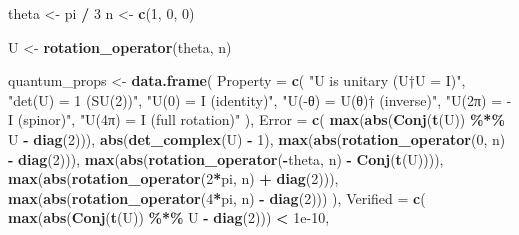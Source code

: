 \documentclass[
]{book}
\newenvironment{Shaded}{\begin{snugshade}}{\end{snugshade}}
\newcommand{\AttributeTok}[1]{\textcolor[rgb]{0.13,0.29,0.53}{#1}}
\newcommand{\DecValTok}[1]{\textcolor[rgb]{0.00,0.00,0.81}{#1}}
\newcommand{\FloatTok}[1]{\textcolor[rgb]{0.00,0.00,0.81}{#1}}
\newcommand{\FunctionTok}[1]{\textcolor[rgb]{0.13,0.29,0.53}{\textbf{#1}}}
\newcommand{\NormalTok}[1]{#1}
\newcommand{\OtherTok}[1]{\textcolor[rgb]{0.56,0.35,0.01}{#1}}
\newcommand{\SpecialCharTok}[1]{\textcolor[rgb]{0.81,0.36,0.00}{\textbf{#1}}}
\newcommand{\StringTok}[1]{\textcolor[rgb]{0.31,0.60,0.02}{#1}}
\theoremstyle{definition}
\theoremstyle{definition}
\theoremstyle{definition}
\theoremstyle{definition}
\theoremstyle{remark}
\begin{document}
\begin{Shaded}
\begin{Highlighting}[]
\NormalTok{theta }\OtherTok{\textless{}{-}}\NormalTok{ pi }\SpecialCharTok{/} \DecValTok{3}
\NormalTok{n }\OtherTok{\textless{}{-}} \FunctionTok{c}\NormalTok{(}\DecValTok{1}\NormalTok{, }\DecValTok{0}\NormalTok{, }\DecValTok{0}\NormalTok{)}

\NormalTok{U }\OtherTok{\textless{}{-}} \FunctionTok{rotation\_operator}\NormalTok{(theta, n)}

\NormalTok{quantum\_props }\OtherTok{\textless{}{-}} \FunctionTok{data.frame}\NormalTok{(}
  \AttributeTok{Property =} \FunctionTok{c}\NormalTok{(}
    \StringTok{"U is unitary (U†U = I)"}\NormalTok{,}
    \StringTok{"det(U) = 1 (SU(2))"}\NormalTok{,}
    \StringTok{"U(0) = I (identity)"}\NormalTok{,}
    \StringTok{"U({-}θ) = U(θ)† (inverse)"}\NormalTok{,}
    \StringTok{"U(2π) = {-}I (spinor)"}\NormalTok{,}
    \StringTok{"U(4π) = I (full rotation)"}
\NormalTok{  ),}
  \AttributeTok{Error =} \FunctionTok{c}\NormalTok{(}
    \FunctionTok{max}\NormalTok{(}\FunctionTok{abs}\NormalTok{(}\FunctionTok{Conj}\NormalTok{(}\FunctionTok{t}\NormalTok{(U)) }\SpecialCharTok{\%*\%}\NormalTok{ U }\SpecialCharTok{{-}} \FunctionTok{diag}\NormalTok{(}\DecValTok{2}\NormalTok{))),}
    \FunctionTok{abs}\NormalTok{(}\FunctionTok{det\_complex}\NormalTok{(U) }\SpecialCharTok{{-}} \DecValTok{1}\NormalTok{),}
    \FunctionTok{max}\NormalTok{(}\FunctionTok{abs}\NormalTok{(}\FunctionTok{rotation\_operator}\NormalTok{(}\DecValTok{0}\NormalTok{, n) }\SpecialCharTok{{-}} \FunctionTok{diag}\NormalTok{(}\DecValTok{2}\NormalTok{))),}
    \FunctionTok{max}\NormalTok{(}\FunctionTok{abs}\NormalTok{(}\FunctionTok{rotation\_operator}\NormalTok{(}\SpecialCharTok{{-}}\NormalTok{theta, n) }\SpecialCharTok{{-}} \FunctionTok{Conj}\NormalTok{(}\FunctionTok{t}\NormalTok{(U)))),}
    \FunctionTok{max}\NormalTok{(}\FunctionTok{abs}\NormalTok{(}\FunctionTok{rotation\_operator}\NormalTok{(}\DecValTok{2}\SpecialCharTok{*}\NormalTok{pi, n) }\SpecialCharTok{+} \FunctionTok{diag}\NormalTok{(}\DecValTok{2}\NormalTok{))),}
    \FunctionTok{max}\NormalTok{(}\FunctionTok{abs}\NormalTok{(}\FunctionTok{rotation\_operator}\NormalTok{(}\DecValTok{4}\SpecialCharTok{*}\NormalTok{pi, n) }\SpecialCharTok{{-}} \FunctionTok{diag}\NormalTok{(}\DecValTok{2}\NormalTok{)))}
\NormalTok{  ),}
  \AttributeTok{Verified =} \FunctionTok{c}\NormalTok{(}
    \FunctionTok{max}\NormalTok{(}\FunctionTok{abs}\NormalTok{(}\FunctionTok{Conj}\NormalTok{(}\FunctionTok{t}\NormalTok{(U)) }\SpecialCharTok{\%*\%}\NormalTok{ U }\SpecialCharTok{{-}} \FunctionTok{diag}\NormalTok{(}\DecValTok{2}\NormalTok{))) }\SpecialCharTok{\textless{}} \FloatTok{1e{-}10}\NormalTok{,}

\end{Highlighting}
\end{Shaded}
\end{document}
